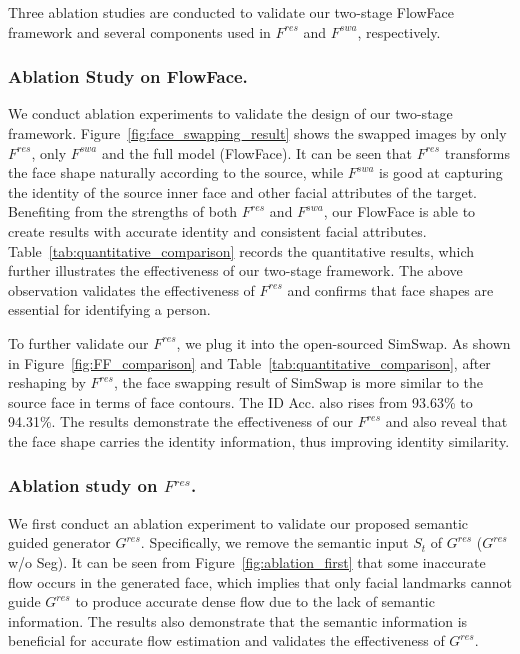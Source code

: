 Three ablation studies are conducted to validate our two-stage FlowFace framework and several components used in $F^{res}$ and $F^{swa}$, respectively.

\subsubsection{Ablation Study on FlowFace.}

We conduct ablation experiments to validate the design of our two-stage framework.
Figure~\ref{fig:face_swapping_result} shows the swapped images by only $F^{res}$, only $F^{swa}$ and the full model (FlowFace). 
It can be seen that $F^{res}$ transforms the face shape naturally according to the source, while $F^{swa}$ is good at capturing the identity of the source inner face and other facial attributes of the target. 
Benefiting from the strengths of both $F^{res}$ and $F^{swa}$, our FlowFace is able to create results with accurate identity and consistent facial attributes. Table~\ref{tab:quantitative_comparison} records the quantitative results, which further illustrates the effectiveness of our two-stage framework. 
The above observation validates the effectiveness of $F^{res}$ and confirms that face shapes are essential for identifying a person.

 To further validate our $F^{res}$, we plug it into the open-sourced SimSwap. As shown in Figure~\ref{fig:FF_comparison} and Table~\ref{tab:quantitative_comparison}, after reshaping by $F^{res}$, the face swapping result of SimSwap is more similar to the source face in terms of face contours. 
 The ID Acc. also rises from 93.63\% to 94.31\%. The results demonstrate the effectiveness of our $F^{res}$ and also reveal that the face shape carries the identity information, thus improving identity similarity.

\subsubsection{Ablation study on $F^{res}$.}

We first conduct an ablation experiment to validate our proposed semantic guided generator $G^{res}$. 
Specifically, we remove the semantic input $S_t$ of $G^{res}$ ($G^{res}$ w/o Seg). It can be seen from Figure~\ref{fig:ablation_first} that some inaccurate flow occurs in the generated face, which implies that only facial landmarks cannot guide $G^{res}$ to produce accurate dense flow due to the lack of semantic information. 
The results also demonstrate that the semantic information is beneficial for accurate flow estimation and validates the effectiveness of $G^{res}$.


